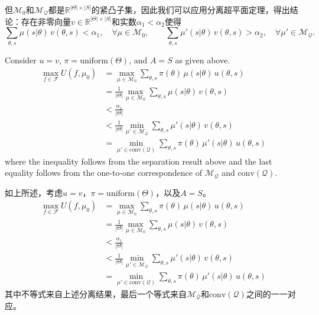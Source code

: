 \documentclass[12pt,a4paper]{article}
\newenvironment{original}
  {\par\vspace{4pt}\noindent\color{black}\ignorespaces}
  {\par\vspace{2pt}}
\newenvironment{translation}
  {\par\vspace{2pt}\noindent\color{myblue}\ignorespaces}
  {\par\vspace{6pt}}
\newcommand{\R}{\mathbb{R}}
\newcommand{\calF}{\mathcal{F}}
\newcommand{\conv}{\mathrm{conv}}
\begin{document}
\begin{translation}
但$\mathcal{M}_0$和$\mathcal{M}_{\mathcal{Q}}$都是$\R^{|\Theta|\times|S|}$的紧凸子集，因此我们可以应用分离超平面定理，得出结论：存在非零向量$v\in\R^{|\Theta|\times|S|}$和实数$\alpha_1<\alpha_2$使得
\begin{equation}
    \sum_{\theta,s} \mu(s|\theta)\,v(\theta,s) < \alpha_1, \quad \forall\mu\in\mathcal{M}_0, \qquad
    \sum_{\theta,s} \mu'(s|\theta)\,v(\theta,s) > \alpha_2, \quad \forall\mu'\in\mathcal{M}_{\mathcal{Q}}.
\end{equation}
\end{translation}

\begin{original}
Consider $u=v$, $\pi=\text{uniform}(\Theta)$, and $A=S$ as given above.
\begin{align}
    \max_{f\in\calF} U(f, \mu_0) &= \max_{\mu\in\mathcal{M}_0} \sum_{\theta,s} \pi(\theta)\,\mu(s|\theta)\,u(\theta,s) \nonumber\\
                                 &= \frac{1}{|\Theta|} \max_{\mu\in\mathcal{M}_0} \sum_{\theta,s} \mu(s|\theta)\,v(\theta,s) \nonumber\\
                                 &< \frac{\alpha_1}{|\Theta|} \nonumber\\
                                 &< \frac{1}{|\Theta|} \min_{\mu'\in\mathcal{M}_{\mathcal{Q}}} \sum_{\theta,s} \mu'(s|\theta)\,v(\theta,s) \nonumber\\
                                 &= \min_{\mu'\in\conv(\mathcal{Q})} \sum_{\theta,s} \pi(\theta)\,\mu'(s|\theta)\,u(\theta,s)
\end{align}
where the inequality follows from the separation result above and the last equality follows from the one-to-one correspondence of $\mathcal{M}_{\mathcal{Q}}$ and $\conv(\mathcal{Q})$.
\end{original}

\begin{translation}
如上所述，考虑$u=v$，$\pi=\text{uniform}(\Theta)$，以及$A=S$。
\begin{align}
    \max_{f\in\calF} U(f, \mu_0) &= \max_{\mu\in\mathcal{M}_0} \sum_{\theta,s} \pi(\theta)\,\mu(s|\theta)\,u(\theta,s) \nonumber\\
                                 &= \frac{1}{|\Theta|} \max_{\mu\in\mathcal{M}_0} \sum_{\theta,s} \mu(s|\theta)\,v(\theta,s) \nonumber\\
                                 &< \frac{\alpha_1}{|\Theta|} \nonumber\\
                                 &< \frac{1}{|\Theta|} \min_{\mu'\in\mathcal{M}_{\mathcal{Q}}} \sum_{\theta,s} \mu'(s|\theta)\,v(\theta,s) \nonumber\\
                                 &= \min_{\mu'\in\conv(\mathcal{Q})} \sum_{\theta,s} \pi(\theta)\,\mu'(s|\theta)\,u(\theta,s)
\end{align}
其中不等式来自上述分离结果，最后一个等式来自$\mathcal{M}_{\mathcal{Q}}$和$\conv(\mathcal{Q})$之间的一一对应。
\end{translation}
\end{document}
